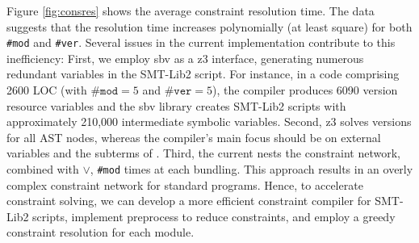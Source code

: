 Figure \ref{fig:consres} shows the average constraint resolution time. 
The data suggests that the resolution time increases polynomially (at least square) for both \texttt{\#mod} and \texttt{\#ver}.
Several issues in the current implementation contribute to this inefficiency:
First, we employ sbv as a z3 interface, generating numerous redundant variables in the SMT-Lib2 script.
For instance, in a code comprising 2600 LOC (with $\texttt{\#mod} =5$ and $\texttt{\#ver} =5$), the \mylang{} compiler produces 6090 version resource variables and the sbv library creates SMT-Lib2 scripts with approximately 210,000 intermediate symbolic variables.
Second, z3 solves versions for all AST nodes, whereas the compiler's main focus should be on external variables and the subterms of \texttt{}.
Third, the current \mylang{} nests the constraint network, combined with $\lor$, \texttt{\#mod} times at each bundling. This approach results in an overly complex constraint network for standard programs.
Hence, to accelerate constraint solving, we can develop a more efficient constraint compiler for SMT-Lib2 scripts, implement preprocess to reduce constraints, and employ a greedy constraint resolution for each module.









